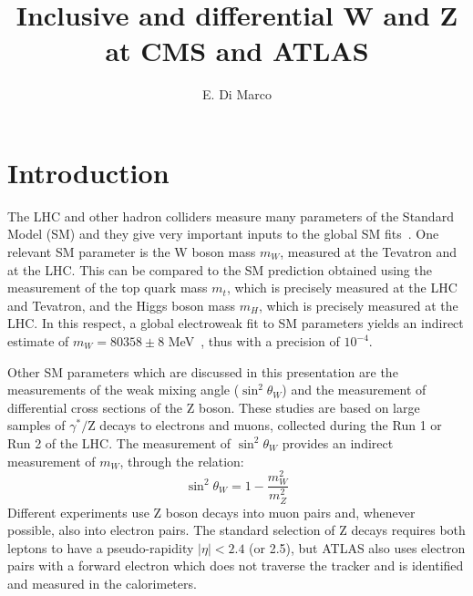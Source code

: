 \documentclass{moriond}
\def\stw{\sin^2\theta_W}
\begin{document}
\vspace*{4cm}
\title{Inclusive and differential W and Z at CMS and ATLAS}


\author{ E. Di Marco }

\address{Istituto Nazionale di Fisica Nucleare, p.le Aldo Moro 2,\\
  Roma 00185, Italy}

\maketitle{}

\section{Introduction}

The LHC and other hadron colliders measure many parameters of the
Standard Model (SM) and they give very important inputs to the global
SM fits~\cite{Baak:2014ora}.  One relevant SM parameter is the W boson
mass $m_W$, measured at the Tevatron and at the LHC. This can be
compared to the SM prediction obtained using the measurement of the
top quark mass $m_t$, which is precisely measured at the LHC and
Tevatron, and the Higgs boson mass $m_H$, which is precisely measured
at the LHC.  In this respect, a global electroweak fit to SM
parameters yields an indirect estimate of $m_W = 80358 \pm 8$
MeV~\cite{Baak:2014ora}, thus with a precision of $10^{-4}$.

Other SM parameters which are discussed in this presentation are the
measurements of the weak mixing angle ($\stw$) and the measurement of
differential cross sections of the Z boson.  These studies are based
on large samples of $\gamma^*/$Z decays to electrons and muons,
collected during the Run 1 or Run 2 of the LHC.  The measurement of
$\stw$ provides an indirect measurement of $m_W$, through the
relation:
%
\begin{equation}
\sin^2\theta_W = 1 - \frac{m_W^2}{m_Z^2}
\label{eqn:stw}
\end{equation}
%
Different experiments use Z boson decays into muon pairs and, whenever
possible, also into electron pairs. The standard selection of Z decays
requires both leptons to have a pseudo-rapidity $\vert\eta\vert<2.4$
(or 2.5), but ATLAS also uses electron pairs with a forward electron
which does not traverse the tracker and is identified and measured in
the calorimeters.
\end{document}
